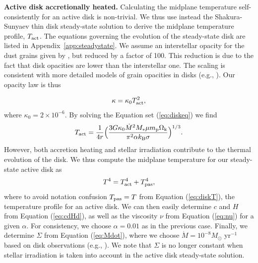\documentclass[apj]{emulateapj}
\newcommand{\App}[1]{Appendix~\ref{#1}}
\begin{document}
\textbf{Active disk accretionally heated.} %
Calculating the midplane temperature self-consistently for an active disk is non-trivial. We thus use instead the Shakura-Sunyaev thin disk steady-state solution to derive the midplane temperature profile, $T_{\rm act}$. The equations governing the evolution of the steady-state disk are listed in \App{app:steadystate}. We assume an interstellar opacity for the dust grains given by \citet{bell94}, but reduced by a factor of 100. This reduction is due to the fact that disk opacities are lower than the interstellar one. The scaling is consistent with more detailed models of grain opacities in disks (e.g., \citealt{mordasini14}). Our opacity law is thus

\begin{equation}
\label{eq:opacity}
\kappa=\kappa_0 T_{\rm act}^2,
\end{equation}
where $\kappa_0=2 \times 10^{-6}$. By solving the Equation set (\ref{eq:diskeq}) we find
\begin{equation}
\label{eq:Tdact}
T_{\rm act}=\frac{1}{4 r} \Big(\frac{3 G \kappa_0\dot{M}^2 M_* \mu m_{\rm p} \Omega_{\rm k}}{\pi^2 \alpha k_{\rm B} \sigma}\Big)^{1/3}.
\end{equation}
However, both accretion heating and stellar irradiation contribute to the thermal evolution of the disk. We thus compute the midplane temperature for our steady-state active disk as
\begin{equation}
\label{eq:activeT}
T^4 = T_{\rm act}^4 + T_{\rm pas}^4,
\end{equation}
where to avoid notation confusion $T_{\rm pas}=T$ from Equation (\ref{eq:diskT}), the temperature profile for an active disk. We can then easily determine  $c$ and $H$ from Equation (\ref{eq:cdHd}), as well as the viscosity $\nu$ from Equation (\ref{eq:nu}) for a given $\alpha$. For consistency, we choose  $\alpha=0.01$ as in the previous case. Finally, we determine $\Sigma$ from Equation (\ref{eq:Mdot}), where we choose $\dot{M}=10^{-8} M_{\odot}$ yr$^{-1}$ based on disk observations (e.g., \citealt{andrews10}). We note that $\Sigma$ is no longer constant when stellar irradiation is taken into account in the active disk steady-state solution. 

\end{document}
